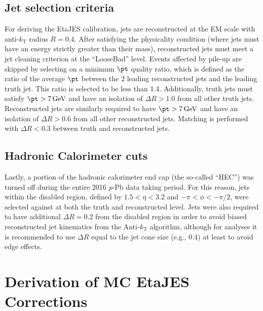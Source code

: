 \documentclass[NOTE, atlasdraft=true, texlive=2016, USenglish]{\ATLASLATEXPATH atlasdoc}
\begin{document}
\subsection{Jet selection criteria}
For deriving the EtaJES calibration, jets are reconstructed at the EM scale with anti-$k_{\text{T}}$ radius $R=0.4$. After satisfying the physicality condition (where jets must have an energy strictly greater than their mass), reconstructed jets must meet a jet cleaning criterion at the ``LooseBad'' level. Events affected by pile-up are skipped by selecting on a minimum $\pt$ quality ratio, which is defined as the ratio of the average $\pt$ between the 2 leading reconstructed jets and the leading truth jet. This ratio is selected to be less than 1.4. Additionally, truth jets must satisfy $\pt > \SI{7}{\GeV}$ and have an isolation of $\Delta R > 1.0$ from all other truth jets. Reconstructed jets are similarly required to have $\pt > \SI{7}{\GeV}$ and have an isolation of $\Delta R > 0.6$ from all other reconstructed jets. Matching is performed with $\Delta R < 0.3$ between truth and reconstructed jets.
\subsection{Hadronic Calorimeter cuts}
Lastly, a portion of the hadronic calorimeter end cap (the so-called ``HEC'') was turned off during the entire 2016 \textit{p}-Pb data taking period. For this reason, jets within the disabled region, defined by $1.5<\eta<3.2$ and $-\pi<\phi<-\pi/2$, were selected against at both the truth and reconstructed level. Jets were also required to have additional $\Delta R=0.2$ from the disabled region in order to avoid biased reconstructed jet kinematics from the Anti-$k_{\text{T}}$ algorithm, although for analyses it is recommended to use $\Delta R$ equal to the jet cone size (e.g., $0.4$) at least to avoid edge effects.

%


\section{Derivation of MC EtaJES Corrections}
\label{sec:EtaJES}
\end{document}
